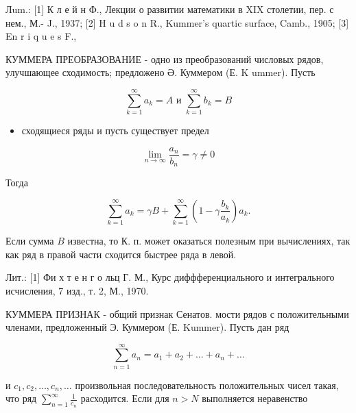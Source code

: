 \documentclass[10pt]{article}
\begin{document}
Лum.: [1] К л е й н Ф., Лекции о развитии математики в XIX столетии, пер. с нем., М.- J., 1937; [2] H u d s o n R., Kummer's quartic surface, Camb., 1905; [3] En r i q u e s F.,



КУММЕРА ПРЕОБРАЗОВАНИЕ - одно из преобразований числовых рядов, улучшающее сходимость; предложено Ә. Куммером (Е. K ummer). Пусть



\[

\sum_{k=1}^{\infty} a_{k}=A \text { и } \sum_{k=1}^{\infty} b_{k}=B

\]



\begin{itemize}

  \item сходящиеся ряды и пусть существует предел

\end{itemize}



\[

\lim _{n \rightarrow \infty} \frac{a_{n}}{b_{n}}=\gamma \neq 0

\]



Тогда



\[

\sum_{k=1}^{\infty} a_{k}=\gamma B+\sum_{k=1}^{\infty}\left(1-\gamma \frac{b_{k}}{a_{k}}\right) a_{k} .

\]



Если сумма $B$ известна, то К. п. может оказаться полезным при вычислениях, так как ряд в правой части сходится быстрее ряда в левой.



Лит.: [1] Фи х т е н г о льц Г. М., Курс диффференциального и интегрального исчисления, 7 изд., т. 2, М., 1970.



КУММЕРА ПРИЗНАК - общий признак Сенатов. мости рядов с положительными членами, предложенный Э. Куммером (Е. Kummer). Пусть дан ряд



\[

\sum_{n=1}^{\infty} a_{n}=a_{1}+a_{2}+\ldots+a_{n}+\ldots

\]



и $c_{1}, c_{2}, \ldots, c_{n}, \ldots$ произвольная последовательность положительных чисел такая, что ряд $\sum_{n=1}^{\infty} \frac{1}{c_{n}}$ расходится. Если для $n>N$ выполняется неравенство
\end{document}
